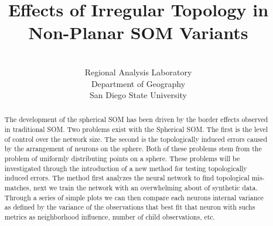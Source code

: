 \documentclass[11pt]{article}
\title{Effects of Irregular Topology in Non-Planar SOM Variants}
\author{\sc{Charles R. Schmidt}\\Regional Analysis Laboratory\\Department of Geography\\San Diego State University}
\begin{document}
\maketitle
\begin{abstract}
The development of the spherical SOM has been driven by the border effects
observed in traditional SOM.  Two problems exist with the Spherical SOM. The
first is the level of control over the network size. The second is the
topologically induced errors caused by the arrangement of neurons on the sphere.
Both of these problems stem from the problem of uniformly distributing points on
a sphere. These problems will be investigated through the introduction of a new method for
testing topologically induced errors. The method first analyzes  the neural
network to find topological mis-matches, next we train the network with an
overwhelming about of synthetic data.  Through a series of simple plots we can
then compare each neurons internal variance as defined by the variance of the
observations that best fit that neuron with suchs metrics as neighborhood
influence, number of child observations, etc.
\end{abstract}


\end{document}
